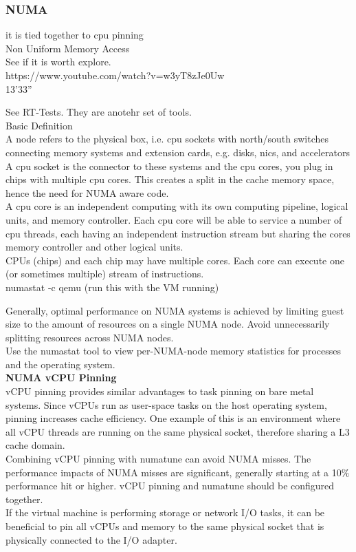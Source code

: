 \documentclass[11pt, a4paper, oneside]{article}
\theoremstyle{definition}
\begin{document}
\subsubsection{NUMA}
it is tied together to cpu pinning\\
Non Uniform Memory Access\\
See if it is worth explore.\\

https://www.youtube.com/watch?v=w3yT8zJe0Uw\\
13'33''

See RT-Tests. They are anotehr set of tools.\\

Basic Definition\\

A node refers to the physical box, i.e. cpu sockets with north/south switches connecting memory systems and extension cards, e.g. disks, nics, and accelerators\\

A cpu socket is the connector to these systems and the cpu cores, you plug in chips with multiple cpu cores. This creates a split in the cache memory space, hence the need for NUMA aware code.\\

A cpu core is an independent computing with its own computing pipeline, logical units, and memory controller. Each cpu core will be able to service a number of cpu threads, each having an independent instruction stream but sharing the cores memory controller and other logical units.\\

CPUs (chips) and each chip may have multiple cores. Each core can execute one (or sometimes multiple) stream of instructions.\\

numastat -c qemu (run this with the VM running)

Generally, optimal performance on NUMA systems is achieved by limiting guest size to the amount of resources on a single NUMA node. Avoid unnecessarily splitting resources across NUMA nodes.\\
Use the numastat tool to view per-NUMA-node memory statistics for processes and the operating system.\\

\textbf{NUMA vCPU Pinning}\\
 vCPU pinning provides similar advantages to task pinning on bare metal systems. Since vCPUs run as user-space tasks on the host operating system, pinning increases cache efficiency. One example of this is an environment where all vCPU threads are running on the same physical socket, therefore sharing a L3 cache domain.\\
Combining vCPU pinning with numatune can avoid NUMA misses. The performance impacts of NUMA misses are significant, generally starting at a 10$\%$ performance hit or higher. vCPU pinning and numatune should be configured together.\\
If the virtual machine is performing storage or network I/O tasks, it can be beneficial to pin all vCPUs and memory to the same physical socket that is physically connected to the I/O adapter. \\
\end{document}
